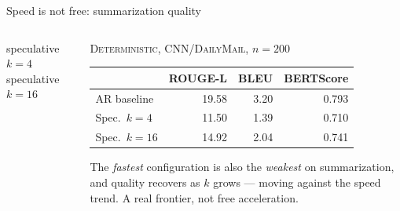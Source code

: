 \documentclass[aspectratio=169, 11pt]{beamer}
\begin{document}
\begin{frame}{Speed is not free: summarization quality}
  \begin{columns}[T,onlytextwidth]
    \begin{column}{0.50\textwidth}
      \vskip4pt
      \chartQuality{3.2cm}
      \vskip3pt
      {\centering
       {\scriptsize\color{ink2}speculative $k{=}4$}\quad
       {\scriptsize\color{ink2}speculative $k{=}16$}\par}
    \end{column}
    \begin{column}{0.47\textwidth}
      {\footnotesize\color{ink2}\textsc{Deterministic, CNN/DailyMail, $n{=}200$}}\par
      \vskip5pt
      {\small
      \begin{tabular}{@{}l@{\hskip 8pt}NNN@{}}
        \toprule
                       & ROUGE-L & BLEU & BERTScore\\
        \midrule
        AR baseline    & 19.58 & 3.20 & 0.793\\
        Spec.\ $k{=}4$ & \textcolor{warm}{11.50} & \textcolor{warm}{1.39} & \textcolor{warm}{0.710}\\
        Spec.\ $k{=}16$& 14.92 & 2.04 & 0.741\\
        \bottomrule
      \end{tabular}}
      \vskip10pt
      \begin{takeawaywarm}
        The \emph{fastest} configuration is also the \emph{weakest} on
        summarization, and quality recovers as $k$ grows --- moving against
        the speed trend. A real frontier, not free acceleration.
      \end{takeawaywarm}
    \end{column}
  \end{columns}
\end{frame}
\end{document}
